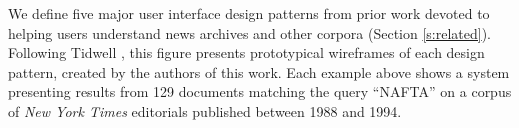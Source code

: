 We define five major user interface design patterns from prior work devoted to helping users understand news archives and other corpora (Section \ref{s:related}). 
Following Tidwell \cite{Tidwell}, this figure presents prototypical wireframes of each design pattern, created by the authors of this work. 
Each example above shows a system presenting results from 129 documents matching the query ``NAFTA'' on a corpus of \textit{New York Times} editorials published between 1988 and 1994.